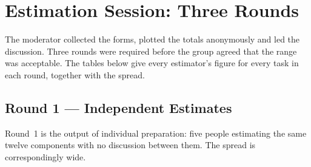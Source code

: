 \documentclass[11pt,a4paper]{report}
\begin{document}
\section{Estimation Session: Three Rounds}

The moderator collected the forms, plotted the totals anonymously and led the
discussion. Three rounds were required before the group agreed that the range was
acceptable. The tables below give every estimator's figure for every task in each
round, together with the spread.

\subsection{Round 1 --- Independent Estimates}

Round~1 is the output of individual preparation: five people estimating the same
twelve components with no discussion between them. The spread is correspondingly
wide.
\end{document}
